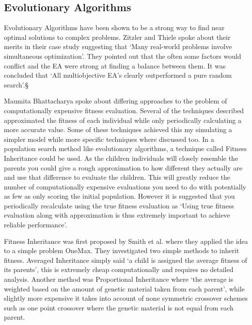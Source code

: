\documentclass[a4paper]{article}
\begin{document}
\subsection{Evolutionary Algorithms}
Evolutionary Algorithms have been shown to be a strong way to find near optimal solutions to complex problems. Zitzler and Thiele spoke about their merits in their case study suggesting that `Many real-world problems involve simultaneous optimization'\cite{EACaseStudy}. They pointed out that the often some factors would conflict and the EA were strong at finding a balance between them. It was concluded that `All multiobjective EA's clearly outperformed a pure random search'\cite{EACaseStudy}.§
\par
Maumita Bhattacharya spoke about differing approaches to the problem of computationally expensive fitness evaluation\cite{expensiveOptimisation}.
Several of the techniques described approximated the fitness of each individual while only periodically calculating a more accurate value.
Some of these techniques achieved this my simulating a simpler model while more specific techniques where discussed too.
In a population search method like evolutionary algorithms, a technique called Fitness Inheritance could be used.
As the children individuals will closely resemble the parents you could give a rough approximation to how different they actually are and use that difference to evaluate the children.
This will greatly reduce the number of computationally expensive evaluations you need to do with potentially as few as only scoring the initial population.
However it is suggested that you periodically recalculate using the true fitness evaluation as `Using true fitness evaluation along with approximation is thus extremely important to achieve reliable performance'.
\par
Fitness Inheritance was first proposed by Smith et al.\cite{fitnessInheritance} where they applied the idea to a simple problem OneMax.
They investigated two simple methods to inherit fitness.
Averaged Inheritance simply said `a child is assigned the average fitness of its parents', this is extremely cheap computationally and requires no detailed analysis.
Another method was Proportional Inheritance where `the average is weighted based on the amount of genetic material taken from each parent', while slightly more expensive it takes into account of none symmetric crossover schemes such as one point crossover where the genetic material is not equal from each parent.
\end{document}
